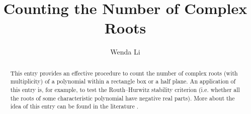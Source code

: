 \documentclass[11pt,a4paper]{article}
\begin{document}
\title{Counting the Number of Complex Roots}
\author{Wenda Li}
\maketitle

\begin{abstract}
  This entry provides an effective procedure to count the number of complex roots (with multiplicity)  of a polynomial within a rectangle box or a half plane. An application of this entry is, for example, to test the Routh–Hurwitz stability criterion (i.e. whether all the roots of some characteristic polynomial have negative real parts). More about the idea of this entry can be found in the literature \cite{eisermann2012fundamental, rahman2002analytic}.
\end{abstract}






\end{document}
